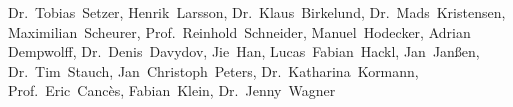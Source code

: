 Dr.~Tobias~Setzer,
Henrik~Larsson,
Dr.~Klaus~Birkelund,
Dr.~Mads~Kristensen,
Maximilian~Scheurer,
Prof.~Reinhold~Schneider,
Manuel~Hodecker,
Adrian Dempwolff,
Dr.~Denis~Davydov,
Jie~Han,
Lucas~Fabian~Hackl,
Jan~Janßen,
Dr.~Tim~Stauch,
Jan~Christoph~Peters,
Dr.~Katharina~Kormann,
Prof.~Eric~Cancès,
Fabian~Klein,
Dr.~Jenny~Wagner